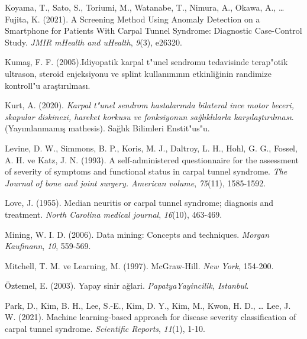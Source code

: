 \documentclass[12pt,twoside]{deuthesis}
\begin{document}
\begin{CSLReferences}
\leavevmode{}%
Koyama, T., Sato, S., Toriumi, M., Watanabe, T., Nimura, A., Okawa, A., \ldots{} Fujita, K. (2021). A Screening Method Using Anomaly Detection on a Smartphone for Patients With Carpal Tunnel Syndrome: Diagnostic Case-Control Study. \emph{JMIR mHealth and uHealth}, \emph{9}(3), e26320.

\leavevmode{}%
Kumaş, F. F. (2005).{I}diyopatik karpal t{"u}nel sendromu tedavisinde terap{"o}tik ultrason, steroid enjeksiyonu ve splint kullan{ı}m{ı}n{ı}n etkinli{ğ}inin randimize kontroll{"u} ara{ş}t{ı}r{ı}lmas{ı}.

\leavevmode{}%
Kurt, A. (2020). \emph{Karpal t{"u}nel sendrom hastalar{ı}nda bilateral ince motor beceri, skapular diskinezi, hareket korkusu ve fonksiyonun sa{ğ}l{ı}kl{ı}larla kar{ş}{ı}la{ş}t{ı}r{ı}lmas{ı}}. (Yayımlanmamış mathesis). Sa{ğ}l{ı}k Bilimleri Enstit{"u}s{"u}.

\leavevmode{}%
Levine, D. W., Simmons, B. P., Koris, M. J., Daltroy, L. H., Hohl, G. G., Fossel, A. H. ve Katz, J. N. (1993). A self-administered questionnaire for the assessment of severity of symptoms and functional status in carpal tunnel syndrome. \emph{The Journal of bone and joint surgery. American volume}, \emph{75}(11), 1585-1592.

\leavevmode{}%
Love, J. (1955). Median neuritis or carpal tunnel syndrome; diagnosis and treatment. \emph{North Carolina medical journal}, \emph{16}(10), 463-469.

\leavevmode{}%
Mining, W. I. D. (2006). Data mining: Concepts and techniques. \emph{Morgan Kaufinann}, \emph{10}, 559-569.

\leavevmode{}%
Mitchell, T. M. ve Learning, M. (1997). McGraw-Hill. \emph{New York}, 154-200.

\leavevmode{}%
Öztemel, E. (2003). Yapay sinir ağlari. \emph{PapatyaYayincilik, Istanbul}.

\leavevmode{}%
Park, D., Kim, B. H., Lee, S.-E., Kim, D. Y., Kim, M., Kwon, H. D., \ldots{} Lee, J. W. (2021). Machine learning-based approach for disease severity classification of carpal tunnel syndrome. \emph{Scientific Reports}, \emph{11}(1), 1-10.


\end{CSLReferences}
\end{document}
